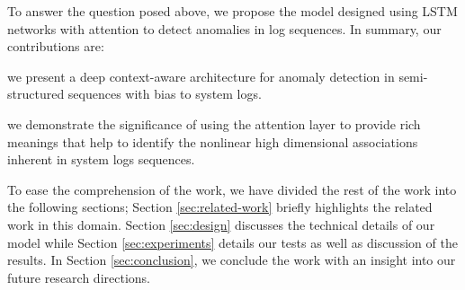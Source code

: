 To answer the question posed above, we propose the model designed using LSTM 
networks with attention to detect anomalies in log sequences. In summary, our 
contributions are:
\begin{enumerate*}[label={\alph*)},font={\bfseries}]
	\item we present a deep context-aware architecture for anomaly detection 
	in semi-structured 	sequences with bias to system logs.
	\item we demonstrate the significance of using the attention layer to 
	provide rich meanings that help to identify the nonlinear high dimensional 
	associations inherent in system logs sequences.
\end{enumerate*} \par
To ease the comprehension of the work, we have divided the rest of the work 
into the following sections; Section \ref{sec:related-work} briefly highlights 
the related work in this domain. Section \ref{sec:design} discusses the 
technical details of our model while Section \ref{sec:experiments} details our 
tests as well as discussion of the results. In Section \ref{sec:conclusion}, we 
conclude the work with an insight into our future research directions.
 
